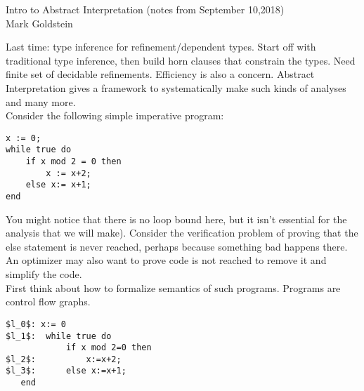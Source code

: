 \documentclass[11pt]{article}
\theoremstyle{definition}
\theoremstyle{plain}
\begin{document}
\begin{center}
Intro to Abstract Interpretation (notes from September 10,2018)\\
Mark Goldstein
\end{center}

\noindent Last time: type inference for refinement/dependent types. Start off with traditional type inference,
then build horn clauses that constrain the types. Need finite set of decidable refinements. Efficiency is also a concern. 
Abstract Interpretation gives a framework to systematically make such kinds of analyses and many more.\\

\noindent Consider the following simple imperative program:
\begin{lstlisting}
x := 0;
while true do
    if x mod 2 = 0 then
        x := x+2;
    else x:= x+1;
end
\end{lstlisting}

\noindent You might notice that there is no loop bound here, but it isn't essential for the analysis that we will make).
Consider the verification problem of proving that the else statement is never reached, perhaps because something bad happens there.
An optimizer may also want to prove code is not reached to remove it and simplify the code.\\

\noindent First think about how to formalize semantics of such programs. Programs are control flow graphs.
\begin{lstlisting}
$l_0$: x:= 0
$l_1$:  while true do
            if x mod 2=0 then
$l_2$:          x:=x+2;
$l_3$:      else x:=x+1;
   end
\end{lstlisting}


\begin{center}
\end{center}
\end{document}
